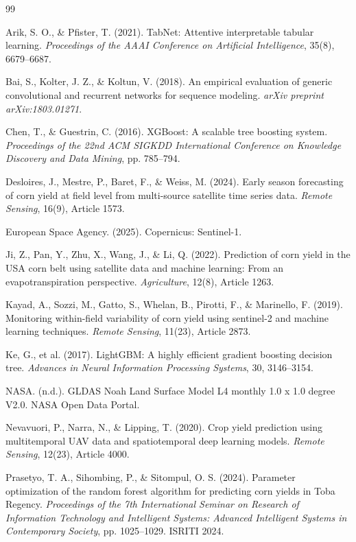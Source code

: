 \documentclass[twocolumn]{article}
\begin{document}
\begin{thebibliography}{99}

 Arik, S. O., \& Pfister, T. (2021). TabNet: Attentive interpretable tabular learning. \textit{Proceedings of the AAAI Conference on Artificial Intelligence}, 35(8), 6679--6687.

 Bai, S., Kolter, J. Z., \& Koltun, V. (2018). An empirical evaluation of generic convolutional and recurrent networks for sequence modeling. \textit{arXiv preprint arXiv:1803.01271}.

 Chen, T., \& Guestrin, C. (2016). XGBoost: A scalable tree boosting system. \textit{Proceedings of the 22nd ACM SIGKDD International Conference on Knowledge Discovery and Data Mining}, pp. 785--794.

 Desloires, J., Mestre, P., Baret, F., \& Weiss, M. (2024). Early season forecasting of corn yield at field level from multi-source satellite time series data. \textit{Remote Sensing}, 16(9), Article 1573.

 European Space Agency. (2025). Copernicus: Sentinel-1.

 Ji, Z., Pan, Y., Zhu, X., Wang, J., \& Li, Q. (2022). Prediction of corn yield in the USA corn belt using satellite data and machine learning: From an evapotranspiration perspective. \textit{Agriculture}, 12(8), Article 1263.

 Kayad, A., Sozzi, M., Gatto, S., Whelan, B., Pirotti, F., \& Marinello, F. (2019). Monitoring within-field variability of corn yield using sentinel-2 and machine learning techniques. \textit{Remote Sensing}, 11(23), Article 2873.

 Ke, G., et al. (2017). LightGBM: A highly efficient gradient boosting decision tree. \textit{Advances in Neural Information Processing Systems}, 30, 3146--3154.

 NASA. (n.d.). GLDAS Noah Land Surface Model L4 monthly 1.0 x 1.0 degree V2.0. NASA Open Data Portal.

 Nevavuori, P., Narra, N., \& Lipping, T. (2020). Crop yield prediction using multitemporal UAV data and spatiotemporal deep learning models. \textit{Remote Sensing}, 12(23), Article 4000.

 Prasetyo, T. A., Sihombing, P., \& Sitompul, O. S. (2024). Parameter optimization of the random forest algorithm for predicting corn yields in Toba Regency. \textit{Proceedings of the 7th International Seminar on Research of Information Technology and Intelligent Systems: Advanced Intelligent Systems in Contemporary Society}, pp. 1025--1029. ISRITI 2024.


\end{thebibliography}
\end{document}
